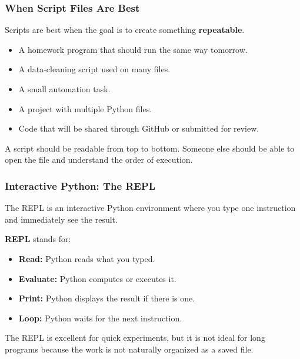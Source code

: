 \documentclass[aspectratio=169,10pt]{beamer}
\newcommand{\keyword}[1]{\textcolor{PrimaryBlue}{\textbf{#1}}}
\begin{document}
\begin{frame}
\frametitle{When Script Files Are Best}
\vspace{0.4cm}
Scripts are best when the goal is to create something \keyword{repeatable}.
\begin{itemize}\setlength\itemsep{0.13cm}
  \item A homework program that should run the same way tomorrow.
  \item A data-cleaning script used on many files.
  \item A small automation task.
  \item A project with multiple Python files.
  \item Code that will be shared through GitHub or submitted for review.
\end{itemize}
\vspace{0.35cm}
\begin{tcolorbox}[lecturebox,title=Important habit]
A script should be readable from top to bottom. Someone else should be able to open the file and understand the order of execution.
\end{tcolorbox}
\end{frame}


\begin{frame}
\frametitle{Interactive Python: The REPL}
\vspace{0.05cm}
\begin{tcolorbox}[lecturebox,title=Key idea]
The REPL is an interactive Python environment where you type one instruction and immediately see the result.
\end{tcolorbox}
\keyword{REPL} stands for:
\begin{itemize}\setlength\itemsep{0.15cm}
  \item \textbf{Read:} Python reads what you typed.
  \item \textbf{Evaluate:} Python computes or executes it.
  \item \textbf{Print:} Python displays the result if there is one.
  \item \textbf{Loop:} Python waits for the next instruction.
\end{itemize}
\vspace{0.25cm}
\begin{tcolorbox}[lecturebox,title=Checkpoint]
The REPL is excellent for quick experiments, but it is not ideal for long programs because the work is not naturally organized as a saved file.
\end{tcolorbox}
\end{frame}
\end{document}
